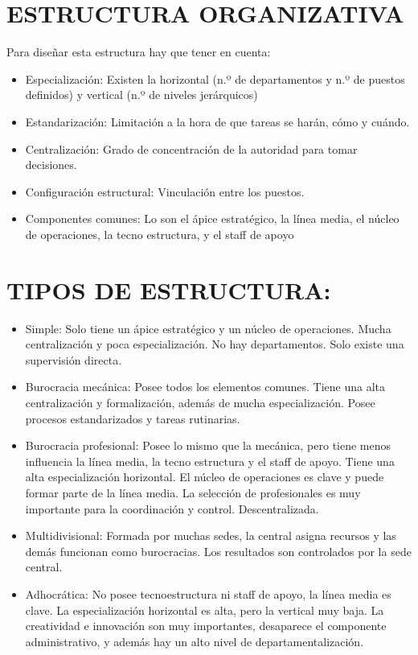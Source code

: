 \documentclass[12pt, twoside, openright]{report} %
\begin{document}
\section{ESTRUCTURA ORGANIZATIVA}
Para diseñar esta estructura hay que tener en cuenta:
\begin{itemize}
	\item Especialización: Existen la horizontal (n.º de departamentos y n.º de puestos definidos) y
vertical (n.º de niveles jerárquicos)
	\item Estandarización: Limitación a la hora de que tareas se harán, cómo y cuándo.
	\item Centralización: Grado de concentración de la autoridad para tomar decisiones.
	\item Configuración estructural: Vinculación entre los puestos.
	\item Componentes comunes: Lo son el ápice estratégico, la línea media, el núcleo de operaciones,
la tecno estructura, y el staff de apoyo
\end{itemize}

\section{TIPOS DE ESTRUCTURA:}
\begin{itemize}
	\item Simple: Solo tiene un ápice estratégico y un núcleo de operaciones. Mucha centralización y poca especialización. No hay departamentos. Solo existe una supervisión directa.
	\item Burocracia mecánica: Posee todos los elementos comunes. Tiene una alta centralización y formalización, además de mucha especialización. Posee procesos estandarizados y tareas rutinarias.
	\item Burocracia profesional: Posee lo mismo que la mecánica, pero tiene menos influencia la línea media, la tecno estructura y el staff de apoyo. Tiene una alta especialización horizontal. El núcleo de operaciones es clave y puede formar parte de la línea media. La selección de profesionales es muy importante para la coordinación y control. Descentralizada.
	\item Multidivisional: Formada por muchas sedes, la central asigna recursos y las demás funcionan como burocracias. Los resultados son controlados por la sede central.
	\item Adhocrática: No posee tecnoestructura ni staff de apoyo, la línea media es clave. La especialización horizontal es alta, pero la vertical muy baja. La creatividad e innovación son muy importantes, desaparece el componente administrativo, y además hay un alto nivel de departamentalización.
\end{itemize}
\pagebreak
\end{document}
